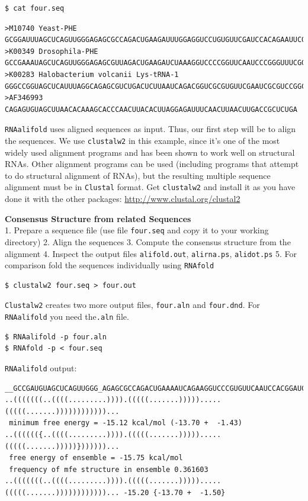 \documentclass[]{article}
\begin{document}
\begin{verbatim}
$ cat four.seq
\end{verbatim}

\begin{verbatim}
>M10740 Yeast-PHE
GCGGAUUUAGCUCAGUUGGGAGAGCGCCAGACUGAAGAUUUGGAGGUCCUGUGUUCGAUCCACAGAAUUCGCA
>K00349 Drosophila-PHE
GCCGAAAUAGCUCAGUUGGGAGAGCGUUAGACUGAAGAUCUAAAGGUCCCCGGUUCAAUCCCGGGUUUCGGCA
>K00283 Halobacterium volcanii Lys-tRNA-1
GGGCCGGUAGCUCAUUUAGGCAGAGCGUCUGACUCUUAAUCAGACGGUCGCGUGUUCGAAUCGCGUCCGGCCCA
>AF346993
CAGAGUGUAGCUUAACACAAAGCACCCAACUUACACUUAGGAGAUUUCAACUUAACUUGACCGCUCUGA
\end{verbatim}

\texttt{RNAalifold} uses aligned sequences as input. Thus, our first step
will be to align the sequences. We use \texttt{clustalw2} in this
example, since it's one of the most widely used alignment programs and
has been shown to work well on structural RNAs. Other alignment programs
can be used (including programs that attempt to do structural alignment
of RNAs), but the resulting multiple sequence alignment must be in
\texttt{Clustal} format. Get \texttt{clustalw2} and install it as you
have done it with the other packages:
\url{http://www.clustal.org/clustal2}

\textbf{Consensus Structure from related Sequences}\\
1. Prepare a sequence file (use file \texttt{four.seq} and copy it to your
working directory) 2. Align the sequences 3. Compute the consensus
structure from the alignment 4. Inspect the output files
\texttt{alifold.out}, \texttt{alirna.ps}, \texttt{alidot.ps} 5. For
comparison fold the sequences individually using \texttt{RNAfold}

\begin{verbatim}
$ clustalw2 four.seq > four.out
\end{verbatim}

\texttt{Clustalw2} creates two more output files, \texttt{four.aln} and
\texttt{four.dnd}. For \texttt{RNAalifold} you need the\texttt{.aln}
file.

\begin{verbatim}
$ RNAalifold -p four.aln
$ RNAfold -p < four.seq
\end{verbatim}

\texttt{RNAalifold} output:

\begin{verbatim}
__GCCGAUGUAGCUCAGUUGGG_AGAGCGCCAGACUGAAAAUCAGAAGGUCCCGUGUUCAAUCCACGGAUCCGGCA__
..(((((((..((((.........)))).(((((.......))))).....(((((.......))))))))))))...
 minimum free energy = -15.12 kcal/mol (-13.70 +  -1.43)
..(((((({..((((.........)))).(((((.......))))).....(((((.......)))))}))))))...
 free energy of ensemble = -15.75 kcal/mol
 frequency of mfe structure in ensemble 0.361603
..(((((((..((((.........)))).(((((.......))))).....(((((.......))))))))))))... -15.20 {-13.70 +  -1.50}
\end{verbatim}
\end{document}
